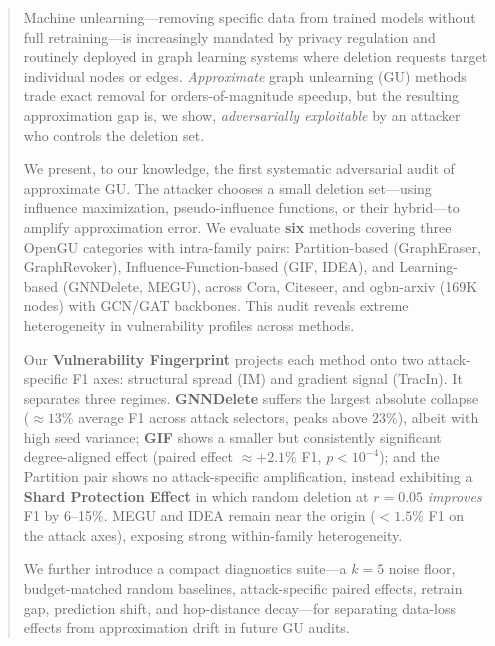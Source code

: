 \begin{abstract}
Machine unlearning---removing specific data from trained models without full
retraining---is increasingly mandated by privacy regulation and routinely
deployed in graph learning systems where deletion requests target individual
nodes or edges. \emph{Approximate} graph unlearning (GU) methods trade exact
removal for orders-of-magnitude speedup, but the resulting approximation gap
is, we show, \emph{adversarially exploitable} by an attacker who controls
the deletion set.

We present, to our knowledge, the first systematic adversarial audit of
approximate GU. The attacker chooses a small deletion set---using
influence maximization, pseudo-influence functions, or their hybrid---to
amplify approximation error. We evaluate \textbf{six} methods covering
three OpenGU categories with intra-family pairs: Partition-based
(GraphEraser, GraphRevoker), Influence-Function-based (GIF, IDEA), and
Learning-based (GNNDelete, MEGU), across Cora, Citeseer, and ogbn-arxiv
(169K nodes) with GCN/GAT backbones. This audit reveals extreme 
heterogeneity in vulnerability profiles across methods.

Our \textbf{Vulnerability Fingerprint} projects each method onto two
attack-specific F1 axes: structural spread (IM) and gradient signal
(TracIn). It separates three regimes. \textbf{GNNDelete} suffers the
largest absolute collapse (${\approx}13\%$ average F1 across attack
selectors, peaks above $23\%$), albeit with high seed variance;
\textbf{GIF} shows a smaller but consistently significant
degree-aligned effect (paired effect $\approx{+}2.1\%$ F1,
$p<10^{-4}$); and the Partition pair shows no attack-specific
amplification, instead exhibiting a \textbf{Shard Protection Effect} in
which random deletion at $r{=}0.05$ \emph{improves} F1 by 6--15\%.
MEGU and IDEA remain near the origin ($<1.5\%$ F1 on the attack axes),
exposing strong within-family heterogeneity.

We further introduce a compact diagnostics suite---a $k{=}5$ noise
floor, budget-matched random baselines, attack-specific paired effects,
retrain gap, prediction shift, and hop-distance decay---for separating
data-loss effects from approximation drift in future GU audits.
\end{abstract}
